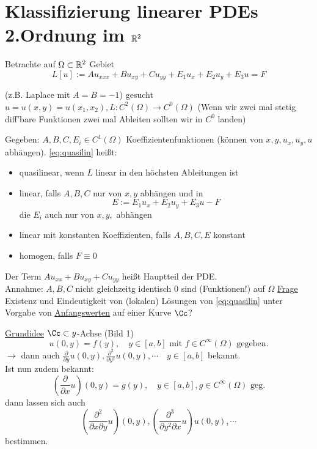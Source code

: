 \section{Klassifizierung linearer PDEs 2.Ordnung im $\mathbb{R}^2$}
Betrachte auf $\Omega\subset\mathbb{R}^2$ Gebiet 
\begin{equation} %
    L[u] := A u_{xxx} + Bu_{xy} + Cu_{yy} + E_1 u_x + E_2 u_y + E_3 u = F
    \label{eq:quasilin}
\end{equation}

(z.B. Laplace mit $A=B=-1$)%
gesucht $u=u(x,y)=u(x_1,x_2), L:C^2(\Omega)\to C^0(\Omega) $
(Wenn wir zwei mal stetig diff'bare Funktionen zwei mal Ableiten sollten wir in $C^0$ landen)

Gegeben: $A,B,C,E_i\in C^1(\Omega)$ Koeffizientenfunktionen (können von $x,y,u_x,u_y,u$ abhängen).
\eqref{eq:quasilin} heißt: 

\begin{itemize}
        \item quasilinear, wenn $L$ linear in den höchsten Ableitungen ist
        \item linear, falls $A,B,C$ nur von $x,y$ abhängen und in
            \begin{equation} %
                E:= E_1 u_x + E_2 u_y + E_3 u - F
            \end{equation}
            die $E_i$ auch nur von $x,y,$ abhängen
        \item linear mit konstanten Koeffizienten, falls $A,B,C,E$ konstant
        \item homogen, falls $F\equiv 0$
\end{itemize}

Der Term $Au_{xx} + Bu_{xy} + Cu_{yy}$ heißt Hauptteil der PDE. \\

Annahme: $A,B,C$ nicht gleichzeitg identisch $0$ sind (Funktionen!) auf $\Omega$
\underline{Frage} Existenz und Eindeutigkeit von (lokalen) Lösungen von \eqref{eq:quasilin} unter Vorgabe von \underline{Anfangswerten} auf einer Kurve $\Cc$? 


\underline{Grundidee}
$\Cc \subset y$-Achse (Bild 1)
\begin{equation} %
    u(0,y) = f(y), \quad y\in[a,b] \text{ mit } f\in C^{\infty}(\Omega) \text{ gegeben.}
    \label{}
\end{equation}
$\to$ dann auch $\frac{\partial}{\partial y} u(0,y), \frac{\partial^2}{\partial y^2} u(0,y),\cdots \quad y\in [a,b]$ bekannt.\\
Ist nun zudem bekannt: 
\[
    \left( \frac{\partial}{\partial x} u \right) (0,y) = g(y), \quad y\in [a,b], g\in C^{\infty}(\Omega) \text{ geg.}
\]
dann lassen sich auch 
\[
    \left( \frac{\partial^2}{\partial x \partial y} u\right)(0,y), 
    \left( \frac{\partial^3}{\partial y^2 \partial x} u \right)u(0,y), \cdots
\]
bestimmen.\\

